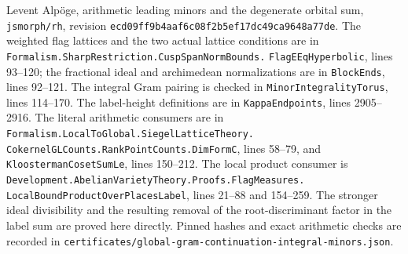Levent Alp\"oge, arithmetic leading minors and the degenerate
orbital sum, \texttt{jsmorph/rh}, revision
\texttt{ecd09ff9b4aaf6c08f2b5ef17dc49ca9648a77de}.
The weighted flag lattices and the two actual lattice conditions
are in \texttt{Formalism.SharpRestriction.CuspSpanNormBounds.}
\texttt{FlagEEqHyperbolic}, lines 93--120; the fractional ideal and
archimedean normalizations are in \texttt{BlockEnds}, lines 92--121.
The integral Gram pairing is checked in \texttt{MinorIntegralityTorus},
lines 114--170.  The label-height definitions are in
\texttt{KappaEndpoints}, lines 2905--2916.
The literal arithmetic consumers are in
\texttt{Formalism.LocalToGlobal.SiegelLatticeTheory.}
\texttt{CokernelGLCounts.RankPointCounts.DimFormC}, lines 58--79,
and \texttt{KloostermanCosetSumLe}, lines 150--212.
The local product consumer is
\texttt{Development.AbelianVarietyTheory.Proofs.FlagMeasures.}
\texttt{LocalBoundProductOverPlacesLabel}, lines 21--88 and 154--259.
The stronger ideal divisibility and the resulting removal of the
root-discriminant factor in the label sum are proved here directly.
Pinned hashes and exact arithmetic checks are recorded in
\texttt{certificates/global-gram-continuation-integral-minors.json}.
